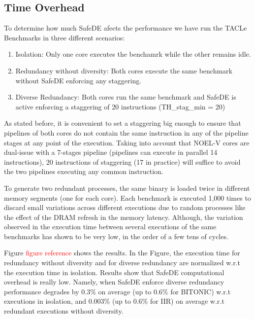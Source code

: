\bigskip



\subsection{Time Overhead}

To determine how much SafeDE afects the performance we have run the TACLe Benchmarks in three different scenarios:

\begin{enumerate}
    \item Isolation: Only one core executes the benchamrk while the other remains idle.
    \item Redundancy without diversity: Both cores execute the same benchmark without SafeDE enforcing any staggering. 
    \item Diverse Redundancy: Both cores run the same benchmark and SafeDE is active enforcing a staggering of 20 instructions (TH\_stag\_min = 20)
\end{enumerate}

As stated before, it is convenient to set a staggering big enough to ensure that pipelines of both cores do not contain the same instruction in any of the pipeline stages at any point of the execution. Taking into account that NOEL-V cores are dual-issue with a 7-stages pipeline (pipelines can execute in parallel 14 instructions), 20 instructions of staggering (17 in practice) will suffice to avoid the two pipelines executing any common instruction. 

To generate two redundant processes, the same binary is loaded twice in different memory segments (one for each core). Each benchmark is executed 1,000 times to discard small variations across different executions due to random processes like the effect of the DRAM refresh in the memory latency. Although, the variation observed in the execution time between several executions of the same benchmarks has shown to be very low, in the order of a few tens of cycles.

Figure \textcolor{red}{figure reference} shows the results. In the Figure, the execution time for redundancy without diversity and for diverse redundancy are normalized w.r.t the execution time in isolation. Results show that SafeDE computational overhead is really low. Namely, when SafeDE enforce diverse redundancy performance degrades by 0.3\% on average (up to 0.6\% for BITONIC) w.r.t executions in isolation, and 0.003\% (up to 0.6\% for IIR) on average w.r.t redundant executions without diversity. 

